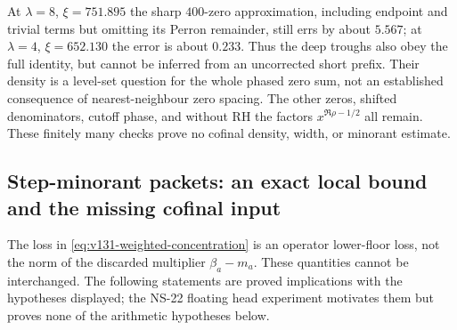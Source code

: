 \documentclass[11pt]{article}
\theoremstyle{remark}
\begin{document}
At $\lambda=8$, $\xi=751.895$ the sharp $400$-zero approximation,
including endpoint and trivial terms but omitting its Perron remainder,
still errs by about $5.567$; at $\lambda=4$, $\xi=652.130$ the error
is about $0.233$. Thus the deep troughs also obey the full identity,
but cannot be inferred from an uncorrected short prefix. Their density
is a level-set question for the whole phased zero sum, not an established
consequence of nearest-neighbour zero spacing. The other zeros, shifted
denominators, cutoff phase, and without RH the factors
$x^{\Re\rho-1/2}$ all remain. These finitely many checks prove no
cofinal density, width, or minorant estimate.

\subsection*{Step-minorant packets: an exact local bound and the missing cofinal input}

The loss in \eqref{eq:v131-weighted-concentration} is an operator
lower-floor loss, not the norm of the discarded multiplier
$\beta_a-m_a$. These quantities cannot be interchanged. The following
statements are proved implications with the hypotheses displayed;
the NS-22 floating head experiment motivates them but proves none of
the arithmetic hypotheses below.
\end{document}
